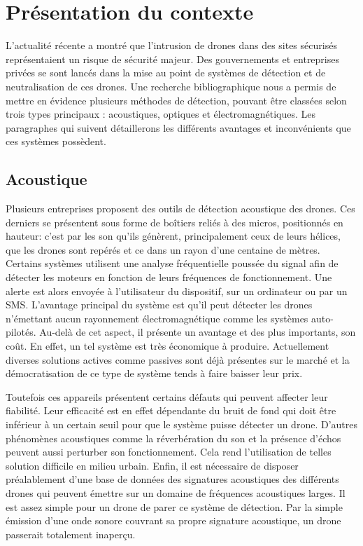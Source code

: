

\chapter{Présentation du contexte}

L'actualité récente a montré que l'intrusion de drones dans des sites sécurisés représentaient un risque de sécurité majeur. Des gouvernements et entreprises privées se sont lancés dans la mise au point de systèmes de détection et de neutralisation de ces drones. Une recherche bibliographique nous a permis de mettre en évidence plusieurs méthodes de détection, pouvant être classées selon trois types principaux : acoustiques, optiques et électromagnétiques.  
Les paragraphes qui suivent détaillerons les différents avantages et inconvénients que ces systèmes possèdent.

\section{Acoustique}

Plusieurs entreprises proposent des outils de détection acoustique des drones. Ces derniers se présentent sous forme de boîtiers reliés à des micros, positionnés en hauteur: c'est par les son qu'ils génèrent, principalement ceux de leurs hélices, que les drones sont repérés et ce dans un rayon d'une centaine de mètres. Certains systèmes utilisent une analyse fréquentielle poussée du signal afin de détecter les moteurs en fonction de leurs fréquences de fonctionnement. Une alerte est alors envoyée à l'utilisateur du dispositif, sur un ordinateur ou par un SMS. L'avantage principal du système est qu'il peut détecter les drones n'émettant aucun rayonnement électromagnétique comme les systèmes auto-pilotés. Au-delà de cet aspect, il présente un avantage et des plus importants, son coût. En effet, un tel système est très économique à produire. Actuellement diverses solutions actives comme passives sont déjà présentes sur le marché et la démocratisation de ce type de système tends à faire baisser leur prix.

Toutefois ces appareils présentent certains défauts qui peuvent affecter leur fiabilité. Leur efficacité est en effet dépendante du bruit de fond qui doit être inférieur à un certain seuil pour que le système puisse détecter un drone. D'autres phénomènes acoustiques comme la réverbération du son et la présence d'échos peuvent aussi perturber son fonctionnement. Cela rend l'utilisation de telles solution difficile en milieu urbain. Enfin, il est nécessaire de disposer préalablement d'une base de données des signatures acoustiques des différents drones qui peuvent émettre sur un domaine de fréquences acoustiques larges. Il est assez simple pour un drone de parer ce système de détection. Par la simple émission d'une onde sonore couvrant sa propre signature acoustique, un drone passerait totalement inaperçu.

